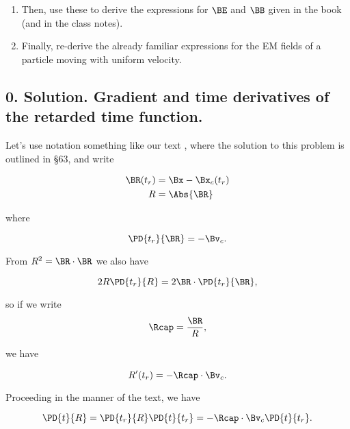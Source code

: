 \begin{enumerate}
\item Then, use these to derive the expressions for $\BE$ and $\BB$ given in the book (and in the class notes).
\item Finally, re-derive the already familiar expressions for the EM fields of a particle moving with uniform velocity.
\end{enumerate}

\subsection{0. Solution.  Gradient and time derivatives of the retarded time function.}

Let's use notation something like our text \cite{landau1980classical}, where the solution to this problem is outlined in \S 63, and write

\begin{align}\label{eqn:relElectroDynProblemSet5:70}
\BR(t_r) &= \Bx - \Bx_c(t_r) \\
R &= \Abs{\BR}
\end{align}

where

\begin{equation}\label{eqn:relElectroDynProblemSet5:90}
\PD{t_r}{\BR} = - \Bv_c.
\end{equation}

From $R^2 = \BR \cdot \BR$ we also have

\begin{equation}\label{eqn:relElectroDynProblemSet5:110}
2 R \PD{t_r}{R} = 2 \BR \cdot \PD{t_r}{\BR},
\end{equation}

so if we write
\begin{equation}\label{eqn:relElectroDynProblemSet5:130}
\Rcap = \frac{\BR}{R},
\end{equation}

we have

\begin{equation}\label{eqn:relElectroDynProblemSet5:150}
R'(t_r) = -\Rcap \cdot \Bv_c.
\end{equation}

Proceeding in the manner of the text, we have

\begin{equation}\label{eqn:relElectroDynProblemSet5:170}
\PD{t}{R} = \PD{t_r}{R} \PD{t}{t_r} = -\Rcap \cdot \Bv_c \PD{t}{t_r}.
\end{equation}


